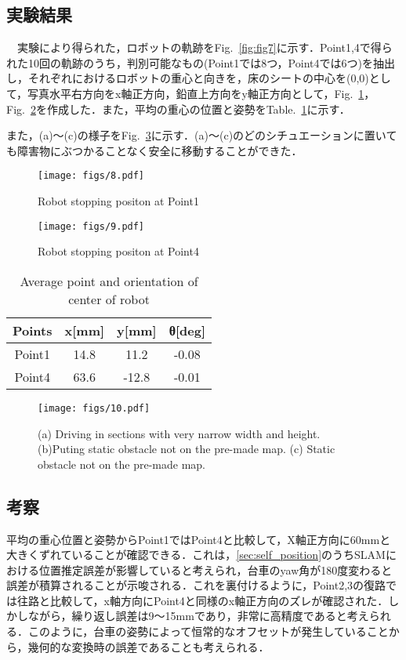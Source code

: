 \subsection{実験結果}
　実験により得られた，ロボットの軌跡をFig.~\ref{fig:fig7}に示す．Point1,4で得られた10回の軌跡のうち，判別可能なもの(Point1では8つ，Point4では6つ)を抽出し，それぞれにおけるロボットの重心と向きを，床のシートの中心を(0,0)として，写真水平右方向をx軸正方向，鉛直上方向をy軸正方向として，Fig.~\ref{fig:fig8}，Fig.~\ref{fig:fig9}を作成した．また，平均の重心の位置と姿勢をTable.~\ref{table2}に示す．

また，(a)〜(c)の様子をFig.~\ref{fig:fig10}に示す．(a)〜(c)のどのシチュエーションに置いても障害物にぶつかることなく安全に移動することができた．

\begin{figure}[!t]
\texttt{[image: figs/8.pdf]}
\caption{Robot stopping positon at Point1}
\label{fig:fig8}
\end{figure}

\begin{figure}[!t]
\texttt{[image: figs/9.pdf]}
\caption{Robot stopping positon at Point4}
\label{fig:fig9}
\end{figure}

\begin{table}[!t]
    \caption{Average point and orientation of center of robot}
    \label{table2}
    \centering
    \begin{tabular}{cccc} \hline
      Points & x[mm] & y[mm] & θ[deg]\\
     \hline \hline
      Point1 & 14.8 & 11.2 & -0.08\\
      Point4 & 63.6 & -12.8 & -0.01\\
      \hline
    \end{tabular}
\end{table}

\begin{figure}[!t]
\texttt{[image: figs/10.pdf]}
\caption{(a) Driving in sections with very narrow width and height. (b)Puting static obstacle not on the pre-made map. (c) Static obstacle not on the pre-made map.}
\label{fig:fig10}
\end{figure}

\subsection{考察}
平均の重心位置と姿勢からPoint1ではPoint4と比較して，X軸正方向に60mmと大きくずれていることが確認できる．これは，\ref{sec:self_position}のうちSLAMにおける位置推定誤差が影響していると考えられ，台車のyaw角が180度変わると誤差が積算されることが示唆される．これを裏付けるように，Point2,3の復路では往路と比較して，x軸方向にPoint4と同様のx軸正方向のズレが確認された．しかしながら，繰り返し誤差は9〜15mmであり，非常に高精度であると考えられる．このように，台車の姿勢によって恒常的なオフセットが発生していることから，幾何的な変換時の誤差であることも考えられる．

